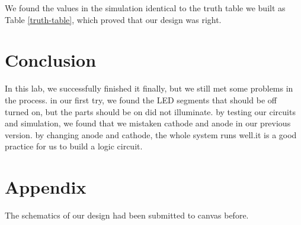 \documentclass{article}
\begin{document}
We found the values in the simulation identical to the truth table we built as Table \ref{truth-table}, which proved that our design was right.

\newpage

\section{Conclusion}
In this lab, we successfully finished it finally, but we still met some problems in the process. in our first try, we found the LED segments that should be off turned on, but the parts should be on did not illuminate. by testing our circuits and simulation, we found that we mistaken cathode and anode in our previous version. by changing anode and cathode, the whole system runs well.it is a good practice for us to build a logic circuit.

\section{Appendix}
The schematics of our design had been submitted to canvas before.
\end{document}
